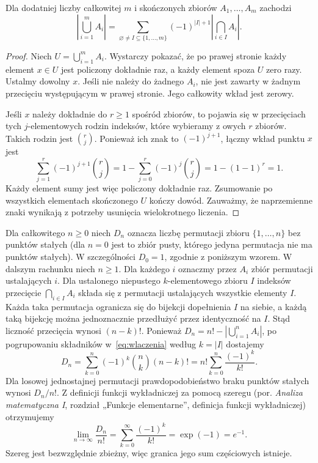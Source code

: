 \begin{twierdzenie}
Dla dodatniej liczby całkowitej $m$ i skończonych zbiorów
$A_1,\ldots,A_m$ zachodzi
\begin{equation}\label{eq:wlaczenia}
\left|\bigcup_{i=1}^m A_i\right|
=\sum_{\varnothing\ne I\subseteq\{1,\ldots,m\}}
 (-1)^{|I|+1}\left|\bigcap_{i\in I}A_i\right|.
\end{equation}
\end{twierdzenie}
\begin{proof}
Niech $U=\bigcup_{i=1}^m A_i$. Wystarczy pokazać, że
po prawej stronie każdy element $x\in U$ jest policzony
dokładnie raz, a każdy element spoza $U$ zero razy.
Ustalmy dowolny $x$. Jeśli nie należy do żadnego $A_i$,
nie jest zawarty w żadnym przecięciu występującym
w prawej stronie. Jego całkowity wkład jest zerowy.

Jeśli $x$ należy dokładnie do $r\geq1$ spośród zbiorów,
to pojawia się w przecięciach tych $j$-elementowych
rodzin indeksów, które wybieramy z owych $r$ zbiorów.
Takich rodzin jest $\binom rj$. Ponieważ ich znak to
$(-1)^{j+1}$, łączny wkład punktu $x$ jest
\[
\sum_{j=1}^r(-1)^{j+1}\binom rj
=1-\sum_{j=0}^r(-1)^j\binom rj
=1-(1-1)^r=1.
\]
Każdy element sumy jest więc policzony dokładnie raz.
Zsumowanie po wszystkich elementach skończonego $U$
kończy dowód. Zauważmy, że naprzemienne znaki wynikają
z potrzeby usunięcia wielokrotnego liczenia.
\end{proof}

\begin{przyklad}
Dla całkowitego $n\geq0$ niech $D_n$ oznacza liczbę permutacji
zbioru $\{1,\ldots,n\}$ bez punktów stałych (dla $n=0$
jest to zbiór pusty, którego jedyna permutacja nie ma punktów stałych).
W szczególności $D_0=1$, zgodnie z poniższym wzorem.
W dalszym rachunku niech $n\geq1$. Dla każdego $i$ oznaczmy przez $A_i$ zbiór permutacji
ustalających $i$. Dla ustalonego niepustego $k$-elementowego zbioru $I$ indeksów przecięcie
$\bigcap_{i\in I}A_i$ składa się z permutacji ustalających
wszystkie elementy $I$. Każda taka permutacja ogranicza się
do bijekcji dopełnienia $I$ na siebie, a każdą taką bijekcję
można jednoznacznie przedłużyć przez identyczność na $I$.
Stąd liczność przecięcia wynosi $(n-k)!$. Ponieważ
$D_n=n!-|\bigcup_{i=1}^n A_i|$, po pogrupowaniu składników
w~\eqref{eq:wlaczenia} według $k=|I|$ dostajemy
\[
D_n=\sum_{k=0}^{n}(-1)^k\binom nk(n-k)!
=n!\sum_{k=0}^{n}\frac{(-1)^k}{k!}.
\]
Dla losowej jednostajnej permutacji prawdopodobieństwo braku punktów
stałych wynosi $D_n/n!$. Z definicji funkcji wykładniczej za pomocą
szeregu (por. \emph{Analiza matematyczna I}, rozdział
„Funkcje elementarne”, definicja funkcji wykładniczej) otrzymujemy
\[
\lim_{n\to\infty}\frac{D_n}{n!}
=\sum_{k=0}^{\infty}\frac{(-1)^k}{k!}=\exp(-1)=e^{-1}.
\]
Szereg jest bezwzględnie zbieżny, więc granica jego sum
częściowych istnieje.
\end{przyklad}

